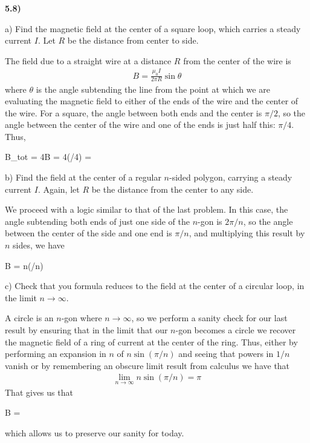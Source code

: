 \documentclass[12pt,a4paper]{article}
\newcommand{\prob}[2]{\textbf{#1)} #2}
\begin{document}
\prob{5.8}{}

a) Find the magnetic field at the center of a square loop, which carries a steady current $I$. Let $R$ be the distance from center to side.

The field due to a straight wire at a distance $R$ from the center of the wire is
\begin{align*}
B = \frac{\mu_0 I}{2 \pi R}\sin{\theta}
\end{align*}
where $\theta$ is the angle subtending the line from the point at which we are evaluating the magnetic field to either of the ends of the wire and the center of the wire.
For a square, the angle between both ends and the center is $\pi/2$, so the angle between the center of the wire and one of the ends is just half this: $\pi/4$.
Thus,
\begin{eqbox}
B_{\rm tot} = 4B = 4\sin(\pi/4) = 
\end{eqbox}

b) Find the field at the center of a regular $n$-sided polygon, carrying a steady current $I$. Again, let $R$ be the distance from the center to any side.

We proceed with a logic similar to that of the last problem.
In this case, the angle subtending both ends of just one side of the $n$-gon is $2\pi/n$, so the angle between the center of the side and one end is $\pi/n$, and multiplying this result by $n$ sides, we have
\begin{eqbox}
B = n\sin(\pi/n)
\end{eqbox}

c) Check that you formula reduces to the field at the center of a circular loop, in the limit $n \rightarrow \infty$.

A circle is an $n$-gon where $n \rightarrow \infty$, so we perform a sanity check for our last result by ensuring that in the limit that our $n$-gon becomes a circle we recover the magnetic field of a ring of current at the center of the ring.
Thus, either by performing an expansion in $n$ of $n\sin(\pi/n)$ and seeing that powers in $1/n$ vanish or by remembering an obscure limit result from calculus we have that 
\begin{align*}
\lim_{n \rightarrow \infty} n\sin(\pi/n) = \pi
\end{align*}
That gives us that 
\begin{eqbox}
B = 
\end{eqbox}
which allows us to preserve our sanity for today.
\end{document}
